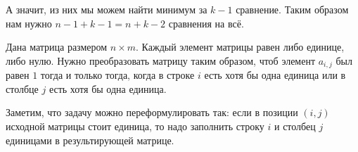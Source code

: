 \documentclass[addpoints]{exam}
\begin{document}
\begin{questions}
\begin{solution}
\begin{center}
\end{center}

А значит, из них мы можем найти минимум за $k-1$ сравнение. Таким образом нам нужно $n-1+k-1=n+k-2$ сравнения на всё.

\end{solution}


\question Дана матрица размером $n \times m$. Каждый элемент матрицы равен либо единице, либо нулю. Нужно преобразовать матрицу таким образом, чтоб элемент $a_{i,j}$ был равен $1$ тогда и только тогда, когда в строке $i$ есть хотя бы одна единица или в столбце $j$ есть хотя бы одна единица. 


\begin{solution}

Заметим, что задачу можно переформулировать так: если в позиции $(i,j)$ исходной матрицы стоит единица, то надо заполнить строку $i$ и столбец $j$ единицами в результирующей матрице.


\end{solution}
\end{questions}
\end{document}
